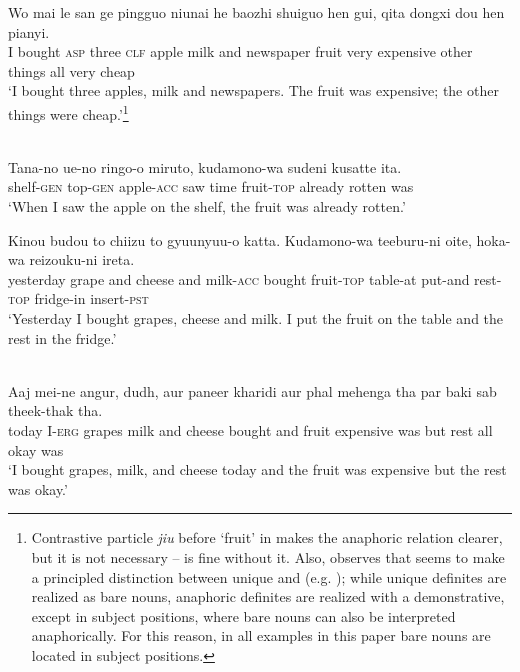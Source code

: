 \documentclass[output=paper,
modfonts
]{langscibook}
\begin{document}
	\ex \label{ex:despic:20b} 
	\gll
	{Wo} {mai} {le} {san} {ge} {pingguo} {niunai} {he} {baozhi} {shuiguo} {hen} {gui,} {qita} {dongxi} {dou} {hen} {pianyi.} \\ 
	I bought \textsc{asp} three \textsc{clf} apple milk and newspaper fruit very expensive other things all very cheap \\
	\glt `I bought three apples, milk and newspapers. The fruit was expensive; the other things were cheap.'\footnote{\label{ft8}Contrastive particle \textit{jiu} before `fruit' in  makes the anaphoric relation clearer, but it is not necessary --  is fine without it. Also, \citet{Jenkstoappear} observes that  seems to make a principled distinction between unique and  (e.g. \citealt{Schwarz2009}); while unique definites are realized as bare nouns, anaphoric definites are realized with a demonstrative, except in subject positions, where bare nouns can also be interpreted anaphorically. For this reason, in all  examples in this paper bare nouns are located in subject positions.} 
	\z 
	\z 
	
	\ea \label{ex:despic:21}
	 \\
	\ea 
	\gll 
	{Tana}-{no} {ue}-{no} {ringo-o} {miruto}, {kudamono}-{wa} {sudeni} {kusatte} {ita}. \\
	shelf-\textsc{gen} {top}-\textsc{gen} apple-\textsc{acc} {saw time} fruit-\textsc{top} already rotten was \\ 
	\glt `When I saw the apple on the shelf, the fruit was already rotten.'
	
	\ex 
	\gll 
	{Kinou} {budou} {to} {chiizu} {to} {gyuunyuu-o} {katta}. {Kudamono-wa} {teeburu-ni} {oite}, {hoka-wa} {reizouku-ni} {ireta}. \\
	yesterday grape and cheese and milk-\textsc{acc} bought fruit-\textsc{top} table-at put-and rest-\textsc{top} fridge-in insert-\textsc{pst} \\
	\glt `Yesterday I bought grapes, cheese and milk. I put the fruit on the table and the rest in the fridge.'
	\z 
	\z\largerpage[-2]\pagebreak
	
	\ea \label{ex:despic:22}
	 \\
	\gll 
	{Aaj} {mei-ne} {angur}, {dudh}, {aur} {paneer} {kharidi} {aur} {phal} {mehenga} {tha} {par} {baki} {sab} {theek-thak} {tha.} \\
	today I-\textsc{erg} grapes milk and cheese bought and fruit expensive was but rest all okay was \\ 
	\glt `I bought grapes, milk, and cheese today and the fruit was expensive but the rest was okay.'
	\z 
	
\end{document}
